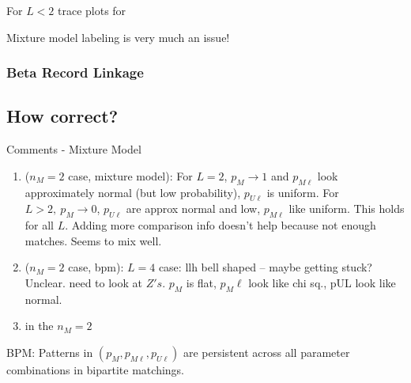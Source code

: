 \documentclass[11pt,reqno]{amsart}
\begin{document}
For $L<2$ trace plots for 

Mixture model labeling is very much an issue! 

\subsubsection{Beta Record Linkage}


\subsection{How correct?}

Comments - Mixture Model

\begin{enumerate} 
\item ($n_M=2$ case, mixture model):  For $L = 2$, $p_M \to 1$ and $p_{M\ell}$ look approximately normal (but low probability), $p_{U\ell}$ is uniform.  For $L>2, \ p_M \to 0 $, $p_{U\ell}$ are approx normal and low, $p_{M\ell}$ like uniform.  This holds for all $L$.  Adding more comparison info doesn't help because not enough matches.  Seems to mix well.
\item ($n_M=2$ case, bpm): $L=4$ case: llh bell shaped -- maybe getting stuck? Unclear. need to look at $Z's$.  $p_M$ is flat, $p_M{\ell}$ look like chi sq., pUL look like normal. %
\item in the $n_M=2$
\end{enumerate}
BPM:
Patterns in $(p_M, p_{M\ell}, p_{U\ell})$ are persistent across all parameter combinations in bipartite matchings. 
\end{document}
